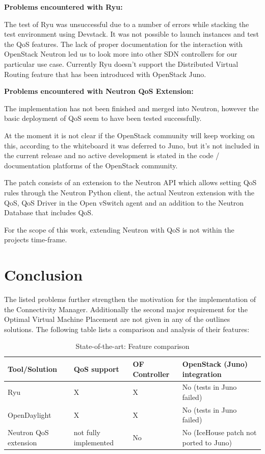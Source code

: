 \textbf{Problems encountered with Ryu:}

The test of Ryu was unsuccessful due to a number of errors while stacking the test environment using Devstack. It was not possible to launch instances and test the QoS features. The lack of proper documentation for the interaction with OpenStack Neutron led us to look more into other SDN controllers for our particular use case. Currently Ryu doesn't support the Distributed Virtual Routing feature that has been introduced with OpenStack Juno.


\textbf{Problems encountered with Neutron QoS Extension:}

The implementation has not been finished and merged into Neutron, however the basic deployment of QoS seem to have been tested successfully. 

At the moment it is not clear if the OpenStack community will keep working on this, according to the whiteboard it was deferred to Juno, but it's not included in the current release and no active development is stated in the code / documentation platforms of the OpenStack community.

The patch consists of an extension to the Neutron API which allows setting QoS rules through the Neutron Python client, the actual Neutron extension with the QoS, QoS Driver in the Open vSwitch agent and an addition to the Neutron Database that includes QoS.

For the scope of this work, extending Neutron with QoS is not within the projects time-frame.

\section{Conclusion}

The listed problems further strengthen the motivation for the implementation of the Connectivity Manager. Additionally the second major requirement for the Optimal Virtual Machine Placement are not given in any of the outlines solutions. The following table lists a comparison and analysis of their features:




\begin{table}[H]
\centering

\begin{tabularx}{\textwidth}{ |X|X|X|X| }
\hline Tool/Solution & QoS support & OF Controller & OpenStack (Juno) integration \\ 
\hline Ryu & X & X & No (tests in Juno failed) \\ 
\hline OpenDaylight & X & X & No (tests in Juno failed) \\ 
\hline Neutron QoS extension & not fully implemented & No & No (IceHouse patch not ported to Juno) \\ 
\hline 
\end{tabularx}

\caption{State-of-the-art: Feature comparison}
\end{table}
